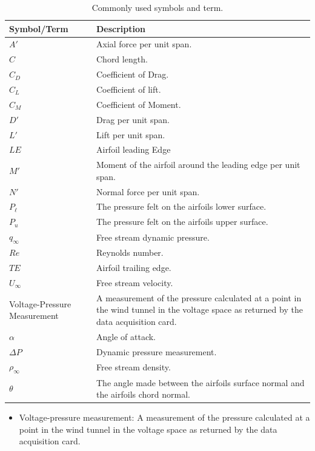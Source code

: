 \documentclass[runningheads]{llncs}
\begin{document}
\begin{table}[h]
    \centering
    \begin{tabular}{||p{4.5cm}|p{11cm}||}
        \hline
        Symbol/Term & Description \\
        \hline
        \hline
        $A'$ & Axial force per unit span. \\
        $C$ & Chord length. \\
        $C_D$ & Coefficient of Drag. \\
        $C_L$ & Coefficient of lift. \\
        $C_M$ & Coefficient of Moment. \\
        $D'$ & Drag per unit span. \\
        $L'$ & Lift per unit span.\\
        $LE$ & Airfoil leading Edge \\
        $M'$ & Moment of the airfoil around the leading edge per unit span. \\
        $N'$ & Normal force per unit span. \\
        $P_\ell$ & The pressure felt on the airfoils lower surface. \\
        $P_u$ & The pressure felt on the airfoils upper surface. \\
        $q_\infty$ & Free stream dynamic pressure. \\
        $Re$ & Reynolds number. \\
        $TE$ & Airfoil trailing edge. \\
        $U_\infty$ & Free stream velocity. \\
        Voltage-Pressure Measurement & A measurement of the pressure calculated at a point in the wind tunnel in the voltage space as returned by the data acquisition card. \\
        $\alpha$ & Angle of attack. \\
        $\Delta P$ & Dynamic pressure measurement. \\
        $\rho_\infty$ & Free stream density. \\
        $\theta$ & The angle made between the airfoils surface normal and the airfoils chord normal. \\
        \hline
    \end{tabular}
    \caption{Commonly used symbols and term.}
    \label{tab:nomenclature}
\end{table}

\begin{itemize}
    \item Voltage-pressure measurement: A measurement of the pressure calculated at a point in the wind tunnel in the voltage space as returned by the data acquisition card.
\end{itemize}
\end{document}
